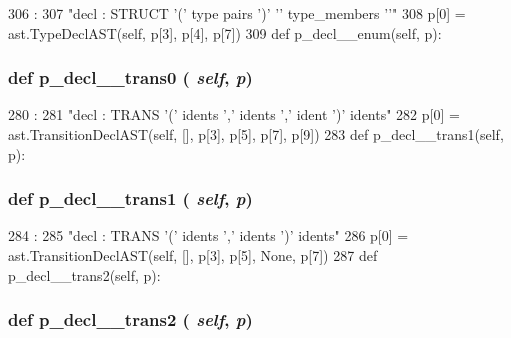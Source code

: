 \begin{DoxyCode}
306                                :
307         "decl : STRUCT '(' type pairs ')' '{' type_members '}'"
308         p[0] = ast.TypeDeclAST(self, p[3], p[4], p[7])
309 
    def p_decl__enum(self, p):
\end{DoxyCode}
\hypertarget{classslicc_1_1parser_1_1SLICC_a0d73b0aebc9d91223e32e7bb44ce4764}{
\subsubsection[{p\_\-decl\_\-\_\-trans0}]{\setlength{\rightskip}{0pt plus 5cm}def p\_\-decl\_\-\_\-trans0 ( {\em self}, \/   {\em p})}}
\label{classslicc_1_1parser_1_1SLICC_a0d73b0aebc9d91223e32e7bb44ce4764}



\begin{DoxyCode}
280                                :
281         "decl : TRANS '(' idents ',' idents ',' ident ')' idents"
282         p[0] = ast.TransitionDeclAST(self, [], p[3], p[5], p[7], p[9])
283 
    def p_decl__trans1(self, p):
\end{DoxyCode}
\hypertarget{classslicc_1_1parser_1_1SLICC_a95a0204b02b8e5a7b3784f4856f6c55d}{
\subsubsection[{p\_\-decl\_\-\_\-trans1}]{\setlength{\rightskip}{0pt plus 5cm}def p\_\-decl\_\-\_\-trans1 ( {\em self}, \/   {\em p})}}
\label{classslicc_1_1parser_1_1SLICC_a95a0204b02b8e5a7b3784f4856f6c55d}



\begin{DoxyCode}
284                                :
285         "decl : TRANS '(' idents ',' idents ')' idents"
286         p[0] = ast.TransitionDeclAST(self, [], p[3], p[5], None, p[7])
287 
    def p_decl__trans2(self, p):
\end{DoxyCode}
\hypertarget{classslicc_1_1parser_1_1SLICC_aad8cd3bf2629bea58f0badde15a00c30}{
\subsubsection[{p\_\-decl\_\-\_\-trans2}]{\setlength{\rightskip}{0pt plus 5cm}def p\_\-decl\_\-\_\-trans2 ( {\em self}, \/   {\em p})}}
\label{classslicc_1_1parser_1_1SLICC_aad8cd3bf2629bea58f0badde15a00c30}



